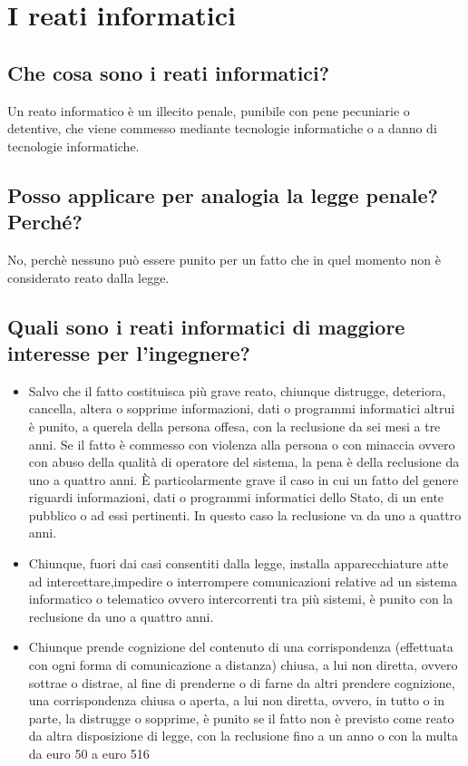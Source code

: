 \newpage
\section{I reati informatici}

\subsection{Che cosa sono i reati informatici?}
Un reato informatico è un illecito penale, punibile con pene pecuniarie o
detentive, che viene commesso mediante tecnologie informatiche o a danno di
tecnologie informatiche.

\subsection{Posso applicare per analogia la legge penale? Perché?}
No, perchè nessuno può essere punito per un fatto che in quel momento non è
considerato reato dalla legge.

\subsection{Quali sono i reati informatici di maggiore interesse per l’ingegnere?}
\begin{itemize}
    \item Salvo che il fatto costituisca più grave reato, chiunque distrugge,
        deteriora, cancella, altera o sopprime informazioni, dati o programmi
        informatici altrui è punito, a querela della persona offesa, con la
        reclusione da sei mesi a tre anni. Se il fatto è commesso con violenza
        alla persona o con minaccia ovvero con abuso della qualità di operatore
        del sistema, la pena è della reclusione da uno a quattro anni.
        \newline È particolarmente grave il caso in cui un fatto del genere
        riguardi informazioni, dati o programmi informatici dello Stato, di un
        ente pubblico o ad essi pertinenti. In questo caso la reclusione va da
        uno a quattro anni.
    \item Chiunque, fuori dai casi consentiti dalla legge, installa
        apparecchiature atte ad intercettare,impedire o interrompere
        comunicazioni relative ad un sistema informatico o telematico ovvero
        intercorrenti tra più sistemi, è punito con la reclusione da uno a
        quattro anni. 
    \item Chiunque prende cognizione del contenuto di una corrispondenza
        (effettuata con ogni forma di comunicazione a distanza) chiusa, a lui
        non diretta, ovvero sottrae o distrae, al fine di prenderne o di farne
        da altri prendere cognizione, una corrispondenza chiusa o aperta, a lui
        non diretta, ovvero, in tutto o in parte, la distrugge o sopprime, è
        punito se il fatto non è previsto come reato da altra disposizione di
        legge, con la reclusione fino a un anno o con la multa da euro 50 a
        euro 516
\end{itemize}

